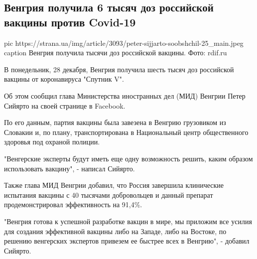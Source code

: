  
 
 
 
 
 
\subsection{Венгрия получила 6 тысяч доз российской вакцины против Covid-19}
\label{sec:29_12_2020.news.ua.strana.1.vengria_sputnik_v_vaccine_covid}



\ifcmt
  pic https://strana.ua/img/article/3093/peter-sijjarto-soobshchil-25_main.jpeg
	caption Венгрия получила тысячи доз российской вакцины. Фото: rdif.ru 
\fi

В понедельник, 28 декабря, Венгрия получила шесть тысяч доз российской вакцины
от коронавируса "Спутник V".

Об этом сообщил глава Министерства иностранных дел (МИД) Венгрии Петер Сийярто
на своей странице в Facebook.

По его данным, партия вакцины была завезена в Венгрию грузовиком из Словакии и,
по плану, транспортирована в Национальный центр общественного здоровья под
охраной полиции.

"Венгерские эксперты будут иметь еще одну возможность решить, каким образом
использовать вакцину", - написал Сийярто.

Также глава МИД Венгрии добавил, что Россия завершила клинические испытания
вакцины с 40 тысячами добровольцев и данный препарат продемонстрировал
эффективность на 91,4\%.

"Венгрия готова к успешной разработке вакцин в мире, мы приложим все усилия для
создания эффективной вакцины либо на Западе, либо на Востоке, по решению
венгерских экспертов привезем ее быстрее всех в Венгрию", - добавил Сийярто.


